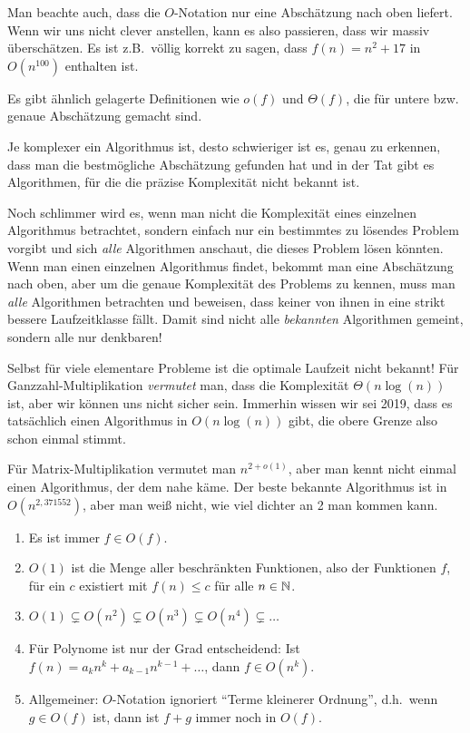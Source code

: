 \begin{remark}
    Man beachte auch, dass die $O$-Notation nur eine Abschätzung nach oben liefert. Wenn wir uns nicht clever anstellen, kann es also passieren, dass wir massiv überschätzen. Es ist z.B.\ völlig korrekt zu sagen, dass $f(n)=n^2+17$ in $O(n^{100})$ enthalten ist.

    \medskip
    Es gibt ähnlich gelagerte Definitionen wie $o(f)$ und $\Theta(f)$, die für untere bzw. genaue Abschätzung gemacht sind.

    \medskip
    Je komplexer ein Algorithmus ist, desto schwieriger ist es, genau zu erkennen, dass man die bestmögliche Abschätzung gefunden hat und in der Tat gibt es Algorithmen, für die die präzise Komplexität nicht bekannt ist.

    \medskip
    Noch schlimmer wird es, wenn man nicht die Komplexität eines einzelnen Algorithmus betrachtet, sondern einfach nur ein bestimmtes zu lösendes Problem vorgibt und sich \emph{alle} Algorithmen anschaut, die dieses Problem lösen könnten. Wenn man einen einzelnen Algorithmus findet, bekommt man eine Abschätzung nach oben, aber um die genaue Komplexität des Problems zu kennen, muss man \emph{alle} Algorithmen betrachten und beweisen, dass keiner von ihnen in eine strikt bessere Laufzeitklasse fällt. Damit sind nicht alle \emph{bekannten} Algorithmen gemeint, sondern alle nur denkbaren!

    \medskip
    Selbst für viele elementare Probleme ist die optimale Laufzeit nicht bekannt! Für Ganzzahl-Multiplikation \emph{vermutet} man, dass die Komplexität $\Theta(n\log(n))$ ist, aber wir können uns nicht sicher sein. Immerhin wissen wir sei 2019, dass es tatsächlich einen Algorithmus in $O(n\log(n))$ gibt, die obere Grenze also schon einmal stimmt.

    Für Matrix-Multiplikation vermutet man $n^{2+o(1)}$, aber man kennt nicht einmal einen Algorithmus, der dem nahe käme. Der beste bekannte Algorithmus ist in $O(n^{2,371552})$, aber man weiß nicht, wie viel dichter an 2 man kommen kann.
\end{remark}


\begin{example}
    \begin{enumerate}
        \item Es ist immer $f\in O(f)$.
        \item $O(1)$ ist die Menge aller beschränkten Funktionen, also der Funktionen $f$, für ein $c$ existiert mit $f(n)\leq c$ für alle $n\in\mathbb{N}$.
        \item $O(1) \subsetneq O(n^2) \subsetneq O(n^3) \subsetneq O(n^4) \subsetneq \ldots$
        \item Für Polynome ist nur der Grad entscheidend: Ist $f(n) = a_k n^k+a_{k-1} n^{k-1} + \ldots $, dann $f\in O(n^k)$.
        \item Allgemeiner: $O$-Notation ignoriert \enquote{Terme kleinerer Ordnung}, d.h.\ wenn $g\in O(f)$ ist, dann ist $f+g$ immer noch in $O(f)$.
    \end{enumerate}
\end{example}

